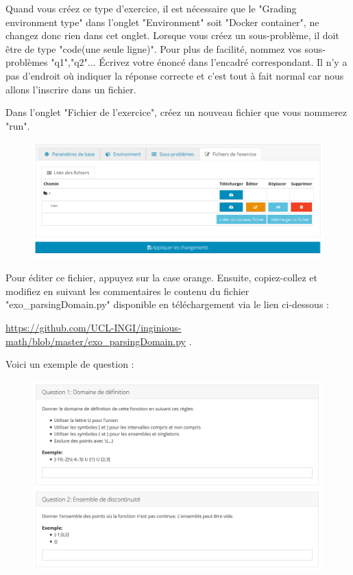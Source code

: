 \documentclass{article}
\begin{document}
Quand vous créez ce type d'exercice, il est nécessaire que le "Grading environment type" dans l'onglet "Environment" soit "Docker container", ne changez donc rien dans cet onglet.
Lorsque vous créez un sous-problème, il doit être de type "code(une seule ligne)". Pour plus de facilité, nommez vos sous-problèmes "q1","q2"... Écrivez votre énoncé dans l'encadré correspondant. Il n'y a pas d'endroit où indiquer la réponse correcte et c'est tout à fait normal car nous allons l'inscrire dans un fichier.

Dans l'onglet "Fichier de l'exercice", créez un nouveau fichier que vous nommerez "run". 

\begin{figure}[!htb]
    \centering
    \includegraphics[scale=0.5]{images/fichier.png}
\end{figure}

Pour éditer ce fichier, appuyez sur la case orange. Ensuite, copiez-collez et modifiez en suivant les commentaires le contenu du fichier "exo\_parsingDomain.py" disponible en téléchargement via le lien ci-dessous :

\bigskip
\url{https://github.com/UCL-INGI/inginious-math/blob/master/exo_parsingDomain.py}
\bigskip.

Voici un exemple de question :

\begin{figure}[!htb]
    \centering
    \includegraphics[scale=0.5]{images/dom.png}
\end{figure}
\end{document}
